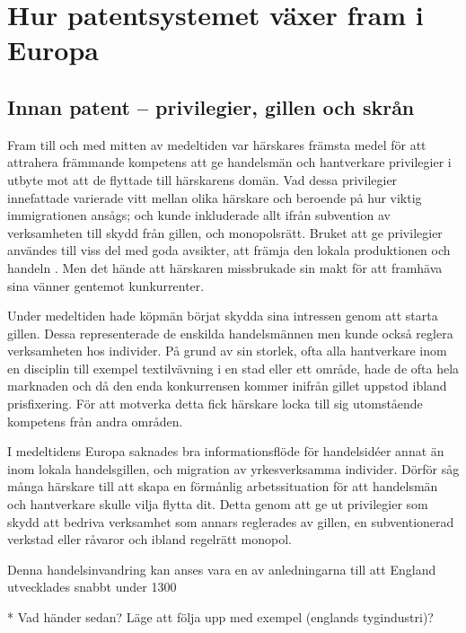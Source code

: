 \section{Hur patentsystemet växer fram i Europa}

\subsection{Innan patent -- privilegier, gillen och skrån} %
\label{sub:innan_patent_systemet}

Fram till och med mitten av medeltiden var härskares främsta medel för att
attrahera främmande kompetens att ge handelsmän och hantverkare privilegier i
utbyte mot att de flyttade till härskarens domän. 
Vad dessa privilegier innefattade varierade vitt mellan olika härskare och
beroende på hur viktig immigrationen ansågs; och kunde inkluderade allt ifrån
subvention av verksamheten till skydd från gillen, och monopolsrätt. 
Bruket att ge privilegier användes till viss del med goda avsikter, att främja
den lokala produktionen och handeln \cite{nard}. Men det hände att härskaren
missbrukade sin makt för att framhäva sina vänner gentemot kunkurrenter.

Under medeltiden hade köpmän börjat skydda sina intressen genom att starta
gillen.
Dessa representerade de enskilda handelsmännen men kunde också reglera
verksamheten hos individer.
På grund av sin storlek, ofta alla hantverkare inom en disciplin till exempel
textilvävning i en stad eller ett område, hade de ofta hela marknaden och då
den enda konkurrensen kommer inifrån gillet uppstod ibland prisfixering. 
För att motverka detta fick härskare locka till sig utomstående kompetens från
andra områden.

I medeltidens Europa saknades bra informationsflöde för handelsidéer annat än
inom lokala handelsgillen, och migration av yrkesverksamma individer. 
Dörför såg många härskare till att skapa en förmånlig arbetssituation för att
handelsmän och hantverkare skulle vilja flytta dit. 
Detta genom att ge ut privilegier som skydd att bedriva verksamhet som annars
reglerades av gillen, en subventionerad verkstad eller råvaror och ibland
regelrätt monopol.

Denna handelsinvandring kan anses vara en av anledningarna till att England
utvecklades snabbt under 1300

* Vad händer sedan? Läge att följa upp med exempel (englands tygindustri)?



